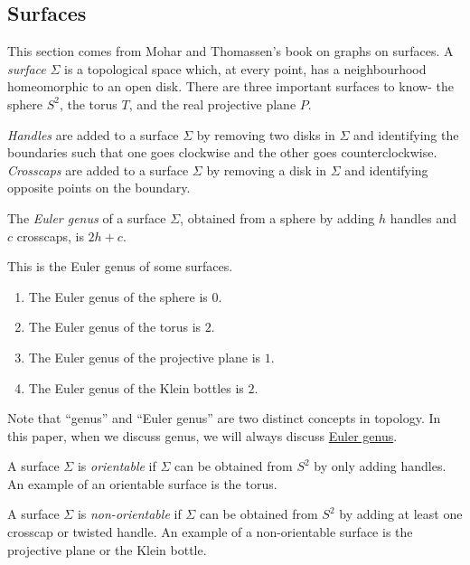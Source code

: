 \subsection{Surfaces}

This section comes from Mohar and Thomassen's\cite{moharGraphsSurfaces2001} book on graphs on surfaces. A \textit{surface} \(\Sigma\) is a topological space which, at every point, has a neighbourhood homeomorphic to an open disk. There are three important surfaces to know- the sphere \(S^2\), the torus \(T\), and the real projective plane \(P\). 

\textit{Handles} are added to a surface \(\Sigma\) by removing two disks in \(\Sigma\) and identifying the boundaries such that one goes clockwise and the other goes counterclockwise. \textit{Crosscaps} are added to a surface $\Sigma$ by removing a disk in \(\Sigma\) and identifying opposite points on the boundary. 
\par
\begin{definition}
	The \textit{Euler genus} of a surface \(\Sigma\), obtained from a sphere by adding \(h\) handles and \(c\) crosscaps, is \(2h + c\).
\end{definition}

\begin{example}
	This is the Euler genus of some surfaces.
	\begin{enumerate}
		\item The Euler genus of the sphere is \(0\).
		\item The Euler genus of the torus is \(2\).
		\item The Euler genus of the projective plane is \(1\). 
		\item The Euler genus of the Klein bottles is \(2\). 
	\end{enumerate}
\end{example}

Note that ``genus'' and ``Euler genus'' are two distinct concepts in topology. In this paper, when we discuss genus, we will always discuss \underline{Euler genus}.

A surface \(\Sigma\) is \textit{orientable} if \(\Sigma\) can be obtained from \(S^2\) by only adding handles. An example of an orientable surface is the torus.

A surface \(\Sigma\) is \textit{non-orientable} if \(\Sigma\) can be obtained from \(S^2\) by adding at least one crosscap or twisted handle. An example of a non-orientable surface is the projective plane or the Klein bottle. 

